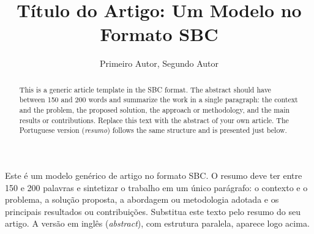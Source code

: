 \documentclass[12pt]{article}
\title{Título do Artigo: Um Modelo no Formato SBC}
\author{Primeiro Autor\inst{1}, Segundo Autor\inst{2}}
\begin{document}
\maketitle

\begin{abstract}
  This is a generic article template in the SBC format. The abstract should have
  between 150 and 200 words and summarize the work in a single paragraph: the
  context and the problem, the proposed solution, the approach or methodology, and
  the main results or contributions. Replace this text with the abstract of your
  own article. The Portuguese version (\textit{resumo}) follows the same structure
  and is presented just below.
\end{abstract}

\begin{resumo}
  Este é um modelo genérico de artigo no formato SBC. O resumo deve ter entre 150
  e 200 palavras e sintetizar o trabalho em um único parágrafo: o contexto e o
  problema, a solução proposta, a abordagem ou metodologia adotada e os principais
  resultados ou contribuições. Substitua este texto pelo resumo do seu artigo. A
  versão em inglês (\textit{abstract}), com estrutura paralela, aparece logo acima.
\end{resumo}










\end{document}
